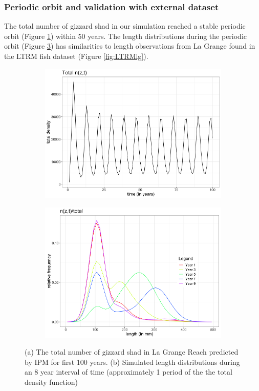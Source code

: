 \documentclass[preprint,review,12pt,authoryear]{elsarticle}
\begin{document}
\subsubsection{Periodic orbit and validation with external dataset}
The total number of gizzard shad in our simulation reached a stable periodic orbit (Figure \ref{fig:ntotal}) within 50 years. 
The length distributions during the periodic orbit (Figure \ref{fig:period}) has similarities to length observations from La Grange found in the LTRM fish dataset (Figure \ref{fig:LTRMlg}). 
\begin{figure}
\centering
\begin{subfigure}[b]{.43\textwidth}
  \includegraphics[width=\textwidth]{figures/ntotal.png}
   \caption{}
  \label{fig:ntotal}
\end{subfigure}
\begin{subfigure}[b]{.43\textwidth}
   \includegraphics[width=\textwidth]{figures/period.png}
     \caption{}
\label{fig:period}
\end{subfigure}
\caption{(a) The total number of gizzard shad in La Grange Reach predicted by IPM for first 100 years. (b) Simulated length distributions during an 8 year interval of time (approximately 1 period of the the total density function) }
\end{figure}    
\end{document}

